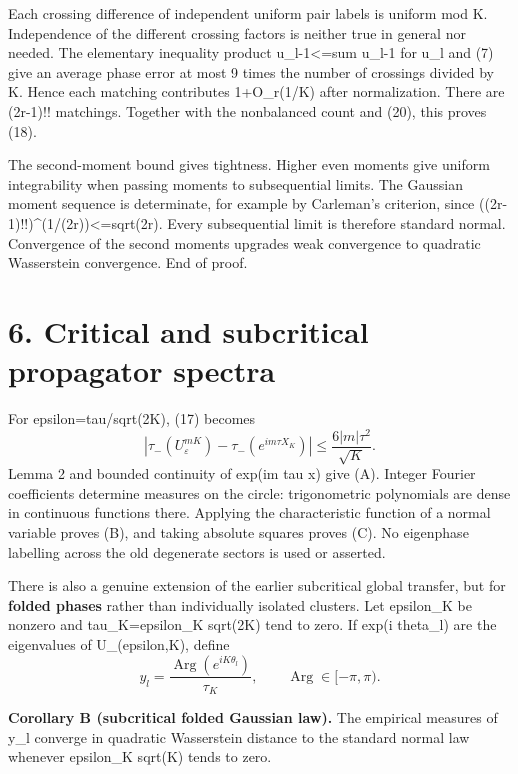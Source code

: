 \documentclass[11pt,a4paper]{article}
\begin{document}
Each crossing difference of independent uniform pair labels is uniform mod K. Independence of the different crossing factors is neither true in general nor needed. The elementary inequality \textbar product u\_l-1\textbar\textless=sum \textbar u\_l-1\textbar{} for \textbar u\_l and (7) give an average phase error at most 9 times the number of crossings divided by K. Hence each matching contributes 1+O\_r(1/K) after normalization. There are (2r-1)!! matchings. Together with the nonbalanced count and (20), this proves (18).

The second-moment bound gives tightness. Higher even moments give uniform integrability when passing moments to subsequential limits. The Gaussian moment sequence is determinate, for example by Carleman's criterion, since ((2r-1)!!)\^{}(1/(2r))\textless=sqrt(2r). Every subsequential limit is therefore standard normal. Convergence of the second moments upgrades weak convergence to quadratic Wasserstein convergence. End of proof.

\hypertarget{critical-and-subcritical-propagator-spectra}{%
\section{6. Critical and subcritical propagator spectra}\label{critical-and-subcritical-propagator-spectra}}

For epsilon=tau/sqrt(2K), (17) becomes \[
 \left|\tau_-(U_\varepsilon^{mK})-
              \tau_-(e^{im\tau X_K})\right|
       \leq \frac{6|m|\tau^2}{\sqrt K}.                        \tag{21}
\] Lemma 2 and bounded continuity of exp(im tau x) give (A). Integer Fourier coefficients determine measures on the circle: trigonometric polynomials are dense in continuous functions there. Applying the characteristic function of a normal variable proves (B), and taking absolute squares proves (C). No eigenphase labelling across the old degenerate sectors is used or asserted.

There is also a genuine extension of the earlier subcritical global transfer, but for \textbf{folded phases} rather than individually isolated clusters. Let epsilon\_K be nonzero and tau\_K=epsilon\_K sqrt(2K) tend to zero. If exp(i theta\_l) are the eigenvalues of U\_(epsilon,K), define \[
 y_l=\frac{\operatorname{Arg}(e^{iK\theta_l})}{\tau_K},
 \qquad \operatorname{Arg}\in[-\pi,\pi).
\]

\textbf{Corollary B (subcritical folded Gaussian law).} The empirical measures of y\_l converge in quadratic Wasserstein distance to the standard normal law whenever epsilon\_K sqrt(K) tends to zero.
\end{document}
